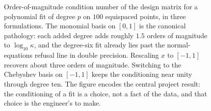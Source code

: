 \begin{figure}[p]
\begin{tikzpicture}[x=1.0cm, y=0.55cm, font=\small]
\end{tikzpicture}
\caption[Vandermonde conditioning as polynomial degree grows]{Order-of-magnitude
condition number of the design matrix for a polynomial fit of degree
$p$ on $100$ equispaced points, in three formulations. The monomial
basis on $[0,1]$ is the canonical pathology: each added degree
adds roughly $1.5$ orders of magnitude to $\log_{10}\kappa$, and the
degree-six fit already lies past the normal-equations refusal line
in double precision. Rescaling $x$ to $[-1,1]$ recovers about three
orders of magnitude. Switching to the Chebyshev basis on $[-1,1]$
keeps the conditioning near unity through degree ten. The figure
encodes the central project result: the conditioning of a fit is a
choice, not a fact of the data, and that choice is the engineer's
to make.}
\label{fig:vol02:ch09:vandermonde-conditioning}
\end{figure}
